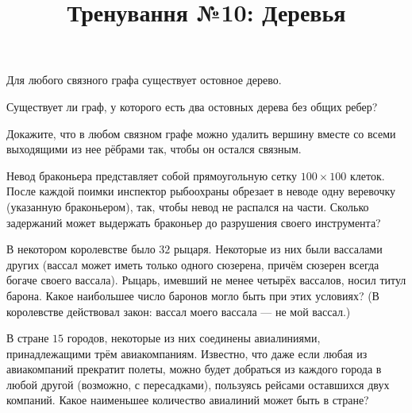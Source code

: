 


\title{Тренування №10: Деревья}
\maketitle
\begin{problem}
	Для любого связного графа существует остовное дерево.
\end{problem}

\begin{problem}
	Существует ли граф, у которого есть два остовных дерева без общих ребер?
\end{problem}

\begin{problem}
	Докажите, что в любом связном графе можно удалить вершину вместе со всеми выходящими из нее рёбрами так, чтобы он остался связным.
\end{problem}

\begin{problem}
	Невод браконьера представляет собой прямоугольную сетку $100 \times 100$ клеток. После каждой поимки инспектор рыбоохраны обрезает в неводе одну веревочку (указанную браконьером), так, чтобы невод не распался на части. Сколько задержаний может выдержать браконьер до разрушения своего инструмента?
\end{problem}

\begin{problem}
	В некотором королевстве было $32$ рыцаря. Некоторые из них были вассалами других (вассал может иметь только одного сюзерена, причём сюзерен всегда богаче своего вассала). Рыцарь, имевший не менее четырёх вассалов, носил титул барона. Какое наибольшее число баронов могло быть при этих условиях? (В королевстве действовал закон: \guillemotleft вассал моего вассала --- не мой вассал\guillemotright.)
\end{problem}

\begin{problem}
	В стране $15$ городов, некоторые из них соединены авиалиниями, принадлежащими трём авиакомпаниям. Известно, что даже если любая из авиакомпаний прекратит полеты, можно будет добраться из каждого города в любой другой (возможно, с пересадками), пользуясь рейсами оставшихся двух компаний. Какое наименьшее количество авиалиний может быть в стране?
\end{problem}


